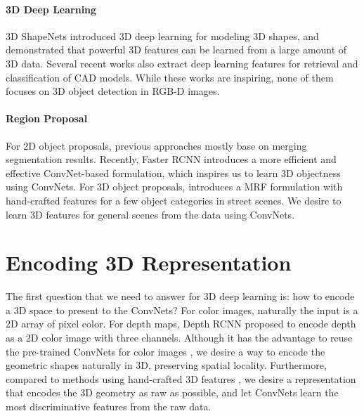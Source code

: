 \documentclass[10pt,twocolumn,letterpaper]{article}
\begin{document}
\vspace{-4mm}\paragraph{3D Deep Learning}
3D ShapeNets \cite{3DShapeNets} introduced 3D deep learning for modeling 3D shapes,
and demonstrated that powerful 3D features can be learned from a large amount of 3D data.
Several recent works \cite{VoxNet,fang20153d,xie2015deepshape,Huang:2015:deeplearningsurfaces}
also extract deep learning features for retrieval and classification of CAD models.
While these works are inspiring,
none of them focuses on 3D object detection in RGB-D images.


\vspace{-4mm}\paragraph{Region Proposal}
For 2D object proposals, previous approaches \cite{SelectiveSearch,arbelaez2014multiscale,depthRCNN} mostly base on merging segmentation results. 
Recently, Faster RCNN \cite{FasterRCNN} introduces a more efficient and effective ConvNet-based formulation, which inspires us to learn 3D objectness using ConvNets.
For 3D object proposals, \cite{XiaozhiChen} introduces a MRF formulation with hand-crafted features for a few object categories in street scenes.
We desire to learn 3D features for general scenes from the data using ConvNets.







\section{Encoding 3D Representation}
\label{sec:Representation}

\vspace{-1mm}

The first question that we need to answer for 3D deep learning is:
how to encode a 3D space to present to the ConvNets?
For color images, naturally the input is a 2D array of pixel color.
For depth maps, Depth RCNN \cite{guptaCVPR15,depthRCNN} proposed to encode depth as a 2D color image with three channels.
Although it has the advantage to reuse the pre-trained ConvNets for color images \cite{gupta2015cross},
we desire a way to encode the geometric shapes naturally in 3D, preserving spatial locality.
Furthermore,
compared to methods using hand-crafted 3D features \cite{fang20153d,xie2015deepshape},
we desire a representation that encodes the 3D geometry as raw as possible, 
and let ConvNets learn the most discriminative features from the raw data.
\end{document}
